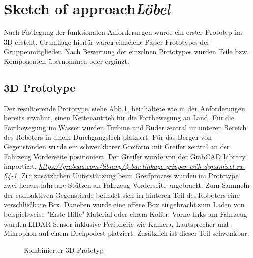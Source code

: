\section{Sketch of approach\hfill\textnormal{\emph{Löbel}}}
Nach Festlegung der funktionalen Anforderungen wurde ein erster Prototyp im 3D erstellt. Grundlage hierfür waren einzelene Paper Prototypes der Gruppenmitglieder. Nach Bewertung der einzelnen Prototypes wurden Teile bzw. Komponenten übernommen oder ergänzt. 


\subsection{3D Prototype}
Der resultierende Prototype, siehe Abb.\ref{fig:model_proto}, beinhaltete wie in den Anforderungen bereits erwähnt, einen Kettenantrieb für die Fortbewegung an Land. Für die Fortbewegung im Wasser wurden Turbine und Ruder zentral im unteren Bereich des Roboters in einem Durchgangsloch platziert. Für das Bergen von Gegenständen wurde ein schwenkbarer Greifarm mit Greifer zentral an der Fahrzeug Vorderseite positioniert. Der Greifer wurde von der GrabCAD Library importiert, \textit{\url{https://grabcad.com/library/4-bar-linkage-gripper-with-dynamixel-rx-64-1}}. Zur zusätzlichen Unterstützung beim Greifprozess wurden im Prototype zwei heraus fahrbare Stützen an Fahrzeug Vorderseite angebracht. Zum Sammeln der radioaktiven Gegenstände befindet sich im hinteren Teil des Roboters eine verschließbare Box. Daneben wurde eine offene Box eingebracht zum Laden von beispielsweise "Erste-Hilfe" Material oder einem Koffer. Vorne links am Fahrzeug wurden LIDAR Sensor inklusive Peripherie wie Kamera, Lautsprecher und Mikrophon auf einem Drehpodest platziert. Zusätzlich ist dieser Teil schwenkbar.

\begin{figure}[H]
  \caption{Kombinierter 3D Prototyp}
  \label{fig:model_proto}
\end{figure}